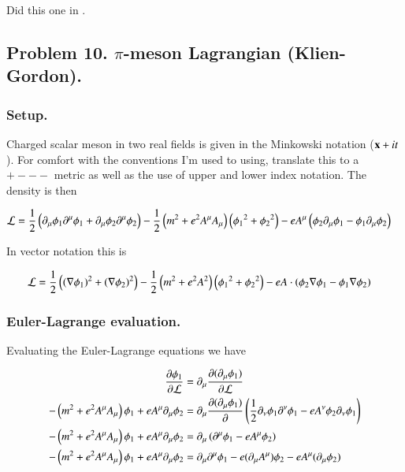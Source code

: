 \documentclass{article}
\begin{document}
Did this one in \cite{PJgoldch1}.

\subsection{ Problem 10.  $\pi$-meson Lagrangian (Klien-Gordon). }

\subsubsection{ Setup. }

Charged scalar meson in two real fields is given in the Minkowski notation ($\mathbf{x} + it$).  For comfort with the conventions
I'm used to using, translate this to a $+---$ metric as well as the use of upper and lower index notation.  The density is 
then

\begin{align}
\mathcal{L} 
&=
\frac{1}{2}\left( 
\partial_\mu \phi_1 \partial^\mu \phi_1
+\partial_\mu \phi_2 \partial^\mu \phi_2
\right)
- \frac{1}{2} \left( m^2 + e^2 A^\mu A_\mu \right) \left( {\phi_1}^2 + {\phi_2}^2 \right)
- e A^\mu \left( 
\phi_2 \partial_\mu \phi_1 - \phi_1 \partial_\mu \phi_2  
\right) 
\end{align}

In vector notation this is

\begin{align}
\mathcal{L} 
&=
\frac{1}{2}\left( (\nabla \phi_1)^2 + (\nabla \phi_2)^2 \right)
- \frac{1}{2} \left( m^2 + e^2 A^2 \right) \left( {\phi_1}^2 + {\phi_2}^2 \right)
- e A \cdot \left( \phi_2 \nabla \phi_1 - \phi_1 \nabla \phi_2  \right) 
\end{align}

\subsubsection{ Euler-Lagrange evaluation. }

Evaluating the Euler-Lagrange equations we have

\begin{align*}
\frac{\partial{\phi_1}}{\partial {\mathcal{L}}}                                                               &= \partial_\mu \frac{\partial{(\partial_\mu \phi_1)}}{\partial {\mathcal{L}}} \\
- \left( m^2 + e^2 A^\mu A_\mu \right) \phi_1 + e A^\mu \partial_\mu \phi_2    &= \partial_\mu \frac{\partial{(\partial_\mu \phi_1)}}{\partial {}} \left( \frac{1}{2} \partial_\nu \phi_1 \partial^\nu \phi_1 - e A^\nu \phi_2 \partial_\nu \phi_1 \right) \\
- \left( m^2 + e^2 A^\mu A_\mu \right) \phi_1 + e A^\mu \partial_\mu \phi_2    &= \partial_\mu \left( \partial^\mu \phi_1 - e A^\mu \phi_2 \right) \\
- \left( m^2 + e^2 A^\mu A_\mu \right) \phi_1 + e A^\mu \partial_\mu \phi_2    &= \partial_\mu \partial^\mu \phi_1 - e (\partial_\mu A^\mu) \phi_2 - e A^\mu (\partial_\mu \phi_2)
\end{align*}
\end{document}
